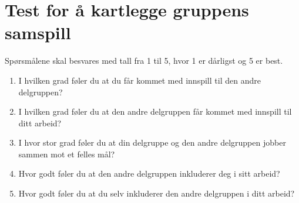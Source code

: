 \chapter{Test for å kartlegge gruppens samspill}
\label{chp:tiltak}
Spørsmålene skal besvares med tall fra 1 til 5, hvor 1 er dårligst og 5 er best.\newline
\begin{enumerate}
\item I hvilken grad  føler du at du får kommet med innspill til den andre delgruppen?
\item I hvilken grad føler du at den andre delgruppen får kommet med innspill til ditt arbeid?
\item I hvor stor grad føler du at din delgruppe og den andre delgruppen jobber sammen mot et felles mål?
\item Hvor godt føler du at den andre delgruppen inkluderer deg i sitt arbeid?
\item Hvor godt føler du at du selv inkluderer den andre delgruppen i ditt arbeid?
\end{enumerate}


